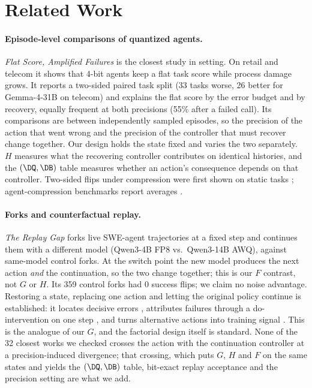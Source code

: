 \section{Related Work}
\label{sec:related}

\paragraph{Episode-level comparisons of quantized agents.} \emph{Flat Score, Amplified Failures} \citep{jang2026flat} is the closest study in setting. On \tautwo{} retail and telecom it shows that 4-bit agents keep a flat task score while process damage grows. It reports a two-sided paired task split (33 tasks worse, 26 better for Gemma-4-31B on telecom) and explains the flat score by the error budget and by recovery, equally frequent at both precisions (55\% after a failed call). %
Its comparisons are between independently sampled episodes, so the precision of the action that went wrong and the precision of the controller that must recover change together. Our design holds the state fixed and varies the two separately. $H$ measures what the recovering controller contributes on identical histories, and the $(\DQ,\DB)$ table measures whether an action's consequence depends on that controller. Two-sided flips under compression were first shown on static tasks \citep{dutta2024accuracy}; agent-compression benchmarks report averages \citep{dong2025acbench}.

\paragraph{Forks and counterfactual replay.} \emph{The Replay Gap} \citep{gonuguntla2026replay} forks live SWE-agent trajectories at a fixed step and continues them with a different model (Qwen3-4B FP8 vs.\ Qwen3-14B AWQ), against same-model control forks. At the switch point the new model produces the next action \emph{and} the continuation, so the two change together; this is our $F$ contrast, not $G$ or $H$. Its 359 control forks had 0 success flips; we claim no noise advantage. %
Restoring a state, replacing one action and letting the original policy continue is established: it locates decisive errors \citep{zhang2025agentracer}, attributes failures through a do-intervention on one step \citep{shah2026car}, and turns alternative actions into training signal \citep{li2026cso,li2026crr}. This is the analogue of our $G$, and the factorial design itself is standard. %
None of the 32 closest works we checked crosses the action with the continuation controller at a precision-induced divergence; that crossing, which puts $G$, $H$ and $F$ on the same states and yields the $(\DQ,\DB)$ table, bit-exact replay acceptance and the precision setting are what we add. %

